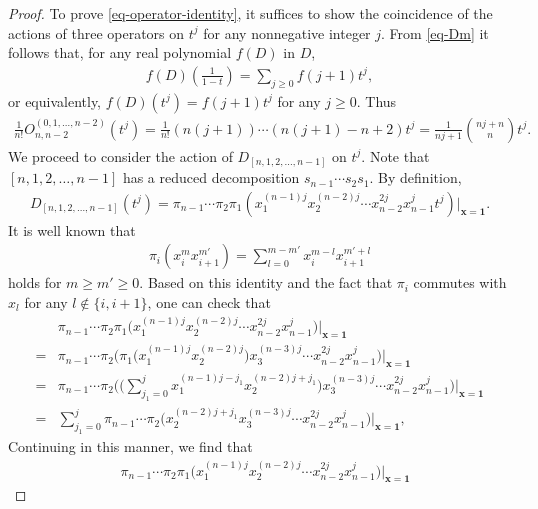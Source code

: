 \documentclass[12pt]{article}
\numberwithin{equation}{section}
\begin{document}
\begin{proof}
To prove \eqref{eq-operator-identity}, it suffices to show the coincidence of the actions of three operators on $t^j$ for any nonnegative integer $j$. 
From \eqref{eq-Dm} it follows that, for any real polynomial $f(D)$ in $D$,  
\begin{align}\label{eq-D-expression}
f(D)\left(\frac{1}{1-t}\right)
=\sum_{j\geq 0}f(j+1) t^{j},
\end{align}
or equivalently, $f(D)(t^j)=f(j+1)t^j$ for any $j\geq 0$. 
Thus
\begin{align*}%
\frac{1}{n!}O^{{(0,1,\ldots,n-2)}}_{n,n-2}(t^j)
=\frac{1}{n!}(n(j+1))\cdots(n(j+1)-n+2)t^j=\frac{1}{nj+1}\binom{nj+n}{n}t^j.
\end{align*}
We proceed to  consider the action of $D_{[n, 1,2,\ldots,n-1]}$ on $t^j$. Note that $[n, 1,2,\ldots,n-1]$ has a reduced decomposition $s_{n-1}\cdots s_2s_1$.
By definition, 
\begin{align*}
D_{[n, 1,2,\ldots,n-1]}(t^j)=\pi_{n-1}\cdots \pi_{2}\pi_{1}\left(x_1^{(n-1)j}x_2^{(n-2)j}\cdots x_{n-2}^{2j}x_{n-1}^jt^j\right)\Big|_{\mathbf{x}=\mathbf{1}}.
\end{align*}
It is well known that  
\begin{align*}%
\pi_i (x_i^mx_{i+1}^{m'})=\sum_{l=0}^{m-m'} x_i^{m-l}x_{i+1}^{m'+l}
\end{align*}
holds for $m\geq m'\geq 0$.
Based on this identity and the fact that $\pi_i$ commutes with $x_l$ for any $l\not\in\{i,i+1\}$, 
one can check that  
\begin{align*}
&\pi_{n-1}\cdots \pi_{2}\pi_{1}\bigl(x_1^{(n-1)j}x_2^{(n-2)j}\cdots x_{n-2}^{2j}x_{n-1}^j\bigr)\bigg|_{\mathbf{x}=\mathbf{1}}
\\[5pt]
=&\pi_{n-1}\cdots\pi_{2}\biggl(\pi_{1}\bigl(x_1^{(n-1)j}x_2^{(n-2)j}\bigr)x_3^{(n-3)j}\cdots x_{n-2}^{2j}x_{n-1}^{j}\biggr)\bigg|_{\mathbf{x}=\mathbf{1}}
\\[5pt]
=&\pi_{n-1}\cdots\pi_{2}\biggl(\biggl(\sum_{j_1=0}^{j}x_1^{(n-1)j-j_1}x_2^{(n-2)j+j_1}\biggr)x_3^{(n-3)j}\cdots x_{n-2}^{2j}x_{n-1}^{j}\biggr)\bigg|_{\mathbf{x}=\mathbf{1}}
\\[5pt]
=&\sum_{j_1=0}^{j}\pi_{n-1}\cdots\pi_{2}\biggl(x_2^{(n-2)j+j_1}x_3^{(n-3)j}\cdots x_{n-2}^{2j}x_{n-1}^{j}\biggr)\bigg|_{\mathbf{x}=\mathbf{1}},
\end{align*}
Continuing in this manner, we find that 
\begin{align*}
&\pi_{n-1}\cdots \pi_{2}\pi_{1}\bigl(x_1^{(n-1)j}x_2^{(n-2)j}\cdots x_{n-2}^{2j}x_{n-1}^j\bigr)\bigg|_{\mathbf{x}=\mathbf{1}}

\end{align*}
\end{proof}
\end{document}
